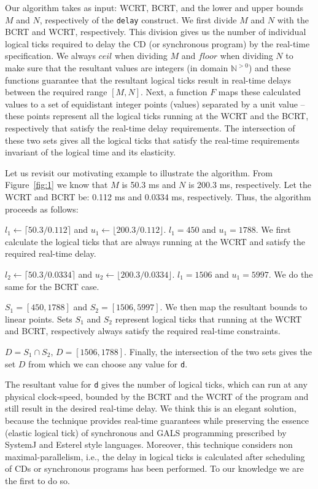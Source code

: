 Our algorithm takes as input: WCRT, BCRT, and the lower and upper bounds
$M$ and $N$, respectively of the \texttt{delay} construct. We first
divide $M$ and $N$ with the BCRT and WCRT, respectively. This division
gives us the number of individual logical ticks required to delay the CD
(or synchronous program) by the real-time specification. We always
$ceil$ when dividing $M$ and $floor$ when dividing $N$ to make sure that
the resultant values are integers (in domain $\mathbb{N}^{>0}$) and
these functions guarantee that the resultant logical ticks result in
real-time delays between the required range $[M,N]$. Next, a function
$F$ maps these calculated values to a set of equidistant integer points
(values) separated by a unit value -- these points represent all the
logical ticks running at the WCRT and the BCRT, respectively that
satisfy the real-time delay requirements. The intersection of these two
sets gives all the logical ticks that satisfy the real-time requirements
invariant of the logical time and its elasticity.

Let us revisit our motivating example to illustrate the algorithm. From
Figure~\ref{fig:1} we know that $M$ is 50.3 ms and $N$ is 200.3 ms,
respectively. Let the WCRT and BCRT be: 0.112 ms and 0.0334 ms,
respectively. Thus, the algorithm proceeds as follows:

\begin{enumerate*}
\item $l_1 \leftarrow \lceil 50.3/0.112 \rceil$ and $u_1 \leftarrow
  \lfloor 200.3/0.112 \rfloor$. $l_1 = 450$ and $u_1 = 1788$. We first
  calculate the logical ticks that are always running at the WCRT and
  satisfy the required real-time delay.
\item $l_2 \leftarrow \lceil 50.3/0.0334 \rceil$ and $u_2 \leftarrow
  \lfloor 200.3/0.0334 \rfloor$. $l_1 = 1506$ and $u_1 = 5997$. We do
  the same for the BCRT case.
\item $S_1 = [450,1788]$ and $S_2 =[1506,5997]$. We then map the
  resultant bounds to linear points. Sets $S_1$ and $S_2$ represent
  logical ticks that running at the WCRT and BCRT, respectively always
  satisfy the required real-time constraints.
\item $D = S_1 \cap S_2$, $D = [1506,1788]$. Finally, the intersection
  of the two sets gives the set $D$ from which we can choose any value
  for \texttt{d}.
\end{enumerate*}

The resultant value for \texttt{d} gives the number of logical ticks,
which can run at any physical clock-speed, bounded by the BCRT and the
WCRT of the program and still result in the desired real-time delay. We
think this is an elegant solution, because the technique provides
real-time guarantees while preserving the essence (elastic logical tick)
of synchronous and GALS programming prescribed by SystemJ and Esterel
style languages. Moreover, this technique considers non
maximal-parallelism, i.e., the delay in logical ticks is calculated
after scheduling of CDs or synchronous programs has been performed. To
our knowledge we are the first to do so.

